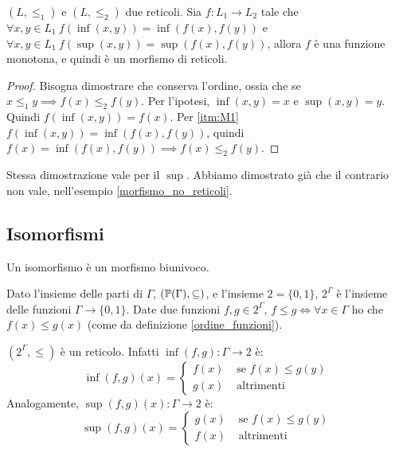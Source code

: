 \begin{prop}
$(L, \le_1)$ e $(L, \le_2)$ due reticoli. Sia $f : L_1 \to L_2$ tale che $\forall x, y \in L_1 \ f(\inf(x,y)) = \inf (f(x),f(y))$ e $\forall x, y \in L_1 \ f(\sup(x,y)) = \sup (f(x),f(y))$, allora $f$ \`e una funzione monotona, e quindi \`e un morfismo di reticoli.
\end{prop}
\begin{proof}
Bisogna dimostrare che conserva l'ordine, ossia che se $x \le_1 y \implies f(x) \le_2 f(y)$. Per l'ipotesi, $\inf(x,y) = x$ e $\sup(x,y)= y$. Quindi $f(\inf(x,y)) = f(x)$. Per \ref{itm:M1} $f(\inf(x,y)) = \inf(f(x),f(y))$, quindi $f(x) = \inf(f(x),f(y)) \implies f(x) \le_2 f(y)$.
\end{proof}
Stessa dimostrazione vale per il $\sup$. Abbiamo dimostrato gi\`a che il contrario non vale, nell'esempio \ref{morfismo_no_reticoli}.

\subsection{Isomorfismi}
Un isomorfismo \`e un morfismo biunivoco.

Dato l'insieme delle parti di $\Gamma$, $(\mathbb{P}(\Gamma), \subseteq)$, e l'insieme $2 = \{ 0, 1 \}$, $2^{\Gamma}$ \`e l'insieme delle funzioni $\Gamma \to \{0,1\}$. Date due funzioni $f, g \in 2^{\Gamma}$, $f \le g \iff \forall x \in \Gamma $ ho che $ f(x) \le g(x)$ (come da  definizione \ref{ordine_funzioni}). 

$(2^{\Gamma}, \le)$ \`e un reticolo. Infatti $\inf(f,g) : \Gamma \to 2$ \`e:
\[
\inf(f,g)(x) = 
\begin{cases}
f(x) & \text{ se } f(x) \le g(y) \\
g(x) & \text{ altrimenti}
\end{cases}
\]
Analogamente, $\sup(f,g)(x) : \Gamma \to 2$ \`e:
\[
\sup(f,g)(x) = 
\begin{cases}
g(x) & \text{ se } f(x) \le g(y) \\
f(x) & \text{ altrimenti}
\end{cases}
\]

